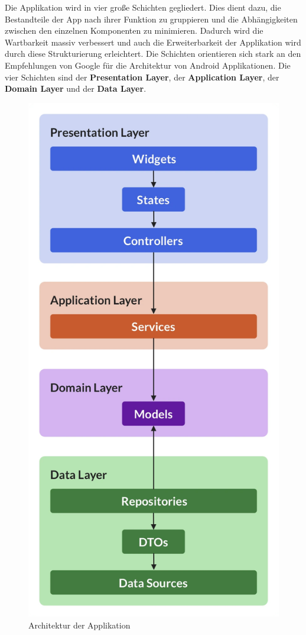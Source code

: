 \documentclass[parskip=full]{scrartcl}
\begin{document}
Die Applikation wird in vier große Schichten gegliedert. Dies dient dazu, die Bestandteile der App nach ihrer Funktion zu gruppieren und die Abhängigkeiten zwischen den einzelnen Komponenten zu minimieren. Dadurch wird die Wartbarkeit massiv verbessert und auch die Erweiterbarkeit der Applikation wird durch diese Strukturierung erleichtert. Die Schichten orientieren sich stark an den Empfehlungen von Google für die Architektur von Android Applikationen. Die vier Schichten sind der \textbf{Presentation Layer}, der \textbf{Application Layer}, der \textbf{Domain Layer} und der \textbf{Data Layer}.
\begin{figure}[htp]
    \centering
    \includegraphics[height = 0.4\textheight]{images/architecture/architecture.png}
    \caption{Architektur der Applikation}
    \label{fig:struktur}
\end{figure}
\end{document}
